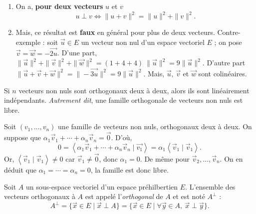 \begin{rmk}
	\begin{enumerate}
		\item On a, \textbf{pour deux vecteurs} $u$\/ et $v$ \[
				u \perp v \iff \|u+v\|^2 = \|u\|^2 + \|v\|^2
			.\]
		\item Mais, ce résultat est \textbf{faux} en général pour plus de deux vecteurs. Contre-exemple : soit $\vec{u} \in E$\/ un vecteur non nul d'un espace vectoriel $E$ ; on pose $\vec{v} = \vec{w} = -\vec{2u}$. D'une part, $\|\vec{u}\|^2 + \|\vec{v}\|^2 + \|\vec{w}\|^2 = (1 + 4 + 4)\:\|\vec{u}\|^2 = 9\|\vec{u}\|^2$. D'autre part $\|\vec{u} + \vec{v} + \vec{w}\|^2 = \|-\vec{3u}\|^2 = 9\|\vec{u}\|^2$. Mais, $\vec{u}$, $\vec{v}$\/ et $\vec{w}$\/ sont colinéaires.
	\end{enumerate}
\end{rmk}

\begin{prop}
	Si $n$\/ vecteurs non nuls sont orthogonaux deux à deux, alors ils sont linéairement indépendants. \textsl{Autrement dit}, une famille orthogonale de vecteurs non nuls est libre.
\end{prop}

\begin{prv}
	Soit $(v_1, \ldots, v_n)$\/ une famille de vecteurs non nuls, orthogonaux deux à deux.
	On suppose que $\alpha_1 \vec{v}_1 + \cdots + \alpha_n \vec{v}_n = \vec{0}$. D'où,
	\[
		0 = \left<\alpha_1 \vec{v}_1 + \cdots + \alpha_n \vec{v}_n  \mid \vec{v_1} \right> = \alpha_1 \left<\vec{v}_1  \mid \vec{v}_1 \right>
	.\] Or, $\left<\vec{v}_1  \mid \vec{v}_1 \right> \neq 0$\/ car $\vec{v}_1 \neq \vec{0}$, donc $\alpha_1 = 0$. De même pour $\vec{v}_2, \ldots, \vec{v}_n$. On en déduit que $\alpha_1 = \cdots = \alpha_n = 0$, la famille est donc libre.
\end{prv}

\begin{defn}
	Soit $A$\/ un sous-espace vectoriel d'un espace préhilbertien $E$.
	L'ensemble des vecteurs orthogonaux à $A$\/ est appelé l'\textit{orthogonal} de $A$ et est noté $A^\perp$\/ : \[
		A^\perp = \{ \vec{x} \in E  \mid \vec{x} \perp A\}
		= \{\vec{x} \in E  \mid \forall \vec{y} \in A,\: \vec{x} \perp \vec{y}\}
	.\]
\end{defn}

